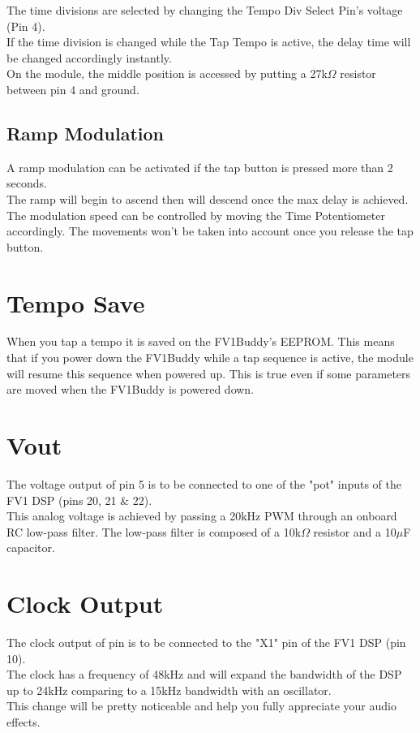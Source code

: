 \documentclass[a4paper, 10pt]{article}
\begin{document}
The time divisions are selected by changing the Tempo Div Select Pin's voltage (Pin 4).\\

If the time division is changed while the Tap Tempo is active, the delay time will be changed accordingly instantly.\\

On the module, the middle position is accessed by putting a 27k$\Omega$ resistor between pin 4 and ground.\\

\subsection{Ramp Modulation}
\label{subsec:ramp}
\bigbreak
A ramp modulation can be activated if the tap button is pressed more than 2 seconds.\\
The ramp will begin to ascend then will descend once the max delay is achieved.\\
The modulation speed can be controlled by moving the Time Potentiometer accordingly. The movements won't be taken into account once you release the tap button.\\

\section{Tempo Save}
\label{sec:temposave}
\bigbreak
When you tap a tempo it is saved on the FV1Buddy's EEPROM. This means that if you power down the FV1Buddy while a tap sequence is active, the module will resume this sequence when powered up. This is true even if some parameters are moved when the FV1Buddy is powered down.\\

\section{Vout}
\label{sec:vout}
\bigbreak
The voltage output of pin 5 is to be connected to one of the "pot" inputs of the FV1 DSP (pins 20, 21 \& 22).\\
This analog voltage is achieved by passing a 20kHz PWM through an onboard RC low-pass filter. The low-pass filter is composed of a 10k$\Omega$ resistor and a 10$\mu$F capacitor.\\

\section{Clock Output}
\label{sec:clock}
\bigbreak
The clock output of pin is to be connected to the "X1" pin of the FV1 DSP (pin 10).\\
The clock has a frequency of 48kHz and will expand the bandwidth of the DSP up to 24kHz comparing to a 15kHz bandwidth with an oscillator.\\
This change will be pretty noticeable and help you fully appreciate your audio effects.\\
\end{document}
